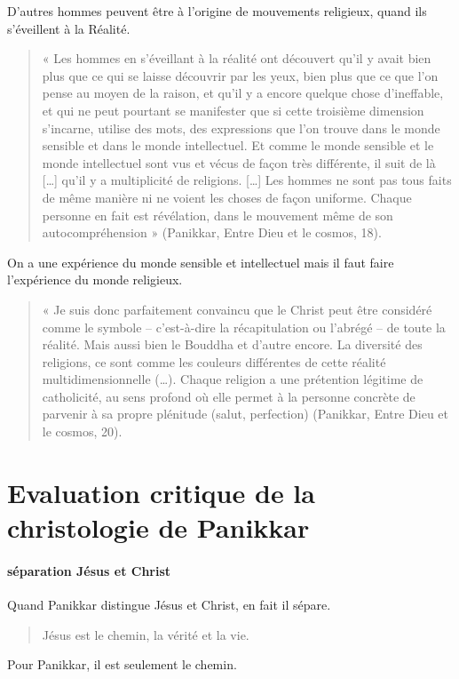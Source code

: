  D'autres hommes peuvent être à l'origine de mouvements religieux, quand ils s'éveillent à la Réalité. 
\begin{quote}
    
« Les hommes en s’éveillant à la réalité ont découvert qu’il y avait bien plus que ce qui se laisse 
découvrir par les yeux, bien plus que ce que l’on pense au moyen de la raison, et qu’il y a encore 
quelque chose d’ineffable, et qui ne peut pourtant se manifester que si cette troisième dimension 
s’incarne, utilise des mots, des expressions que l’on trouve dans le monde sensible et dans le 
monde intellectuel. Et comme le monde sensible et le monde intellectuel sont vus et vécus de façon 
très différente, il suit de là […] qu’il y a multiplicité de religions. […] Les hommes ne sont pas 
tous faits de même manière ni ne voient les choses de façon uniforme. Chaque  personne  en  fait  
est  révélation,  dans  le  mouvement  même  de  son autocompréhension » (Panikkar, Entre Dieu et 
le cosmos, 18).
\end{quote}
On a une expérience du monde sensible et intellectuel mais il faut faire l'expérience du monde religieux.


\begin{quote}
« Je suis donc parfaitement convaincu que le Christ peut être considéré comme le symbole – 
c’est-à-dire la récapitulation ou l’abrégé – de toute la réalité. Mais aussi bien le Bouddha et 
d’autre encore. La diversité des religions, ce sont comme les couleurs différentes de cette réalité 
multidimensionnelle (…). Chaque religion a une prétention légitime de catholicité, au sens profond 
où elle permet à la personne concrète de parvenir à sa propre plénitude (salut,
perfection) (Panikkar, Entre Dieu et le cosmos, 20).
\end{quote}

 
\section{Evaluation critique de la christologie de Panikkar}

\paragraph{séparation Jésus et Christ}
Quand Panikkar distingue Jésus et Christ, en fait il sépare. 
\begin{quote}
    Jésus est le chemin, la vérité et la vie.
\end{quote}
Pour Panikkar, il est seulement le chemin.

